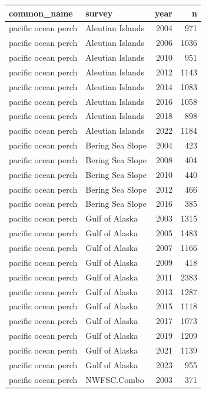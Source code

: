 \documentclass[
  letterpaper,
  DIV=11,
  numbers=noendperiod]{scrartcl}
\begin{document}
\begin{tabular}[t]{l|l|r|r}
\hline
common\_name & survey & year & n\\
\hline
pacific ocean perch & Aleutian Islands & 2004 & 971\\
\hline
pacific ocean perch & Aleutian Islands & 2006 & 1036\\
\hline
pacific ocean perch & Aleutian Islands & 2010 & 951\\
\hline
pacific ocean perch & Aleutian Islands & 2012 & 1143\\
\hline
pacific ocean perch & Aleutian Islands & 2014 & 1083\\
\hline
pacific ocean perch & Aleutian Islands & 2016 & 1058\\
\hline
pacific ocean perch & Aleutian Islands & 2018 & 898\\
\hline
pacific ocean perch & Aleutian Islands & 2022 & 1184\\
\hline
pacific ocean perch & Bering Sea Slope & 2004 & 423\\
\hline
pacific ocean perch & Bering Sea Slope & 2008 & 404\\
\hline
pacific ocean perch & Bering Sea Slope & 2010 & 440\\
\hline
pacific ocean perch & Bering Sea Slope & 2012 & 466\\
\hline
pacific ocean perch & Bering Sea Slope & 2016 & 385\\
\hline
pacific ocean perch & Gulf of Alaska & 2003 & 1315\\
\hline
pacific ocean perch & Gulf of Alaska & 2005 & 1483\\
\hline
pacific ocean perch & Gulf of Alaska & 2007 & 1166\\
\hline
pacific ocean perch & Gulf of Alaska & 2009 & 418\\
\hline
pacific ocean perch & Gulf of Alaska & 2011 & 2383\\
\hline
pacific ocean perch & Gulf of Alaska & 2013 & 1287\\
\hline
pacific ocean perch & Gulf of Alaska & 2015 & 1118\\
\hline
pacific ocean perch & Gulf of Alaska & 2017 & 1073\\
\hline
pacific ocean perch & Gulf of Alaska & 2019 & 1209\\
\hline
pacific ocean perch & Gulf of Alaska & 2021 & 1139\\
\hline
pacific ocean perch & Gulf of Alaska & 2023 & 955\\
\hline
pacific ocean perch & NWFSC.Combo & 2003 & 371\\

\end{tabular}
\end{document}
